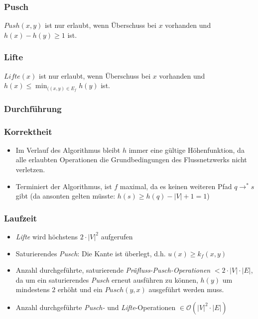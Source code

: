 \subsubsection{Pusch}
\(Push(x,y)\) ist nur erlaubt, wenn Überschuss bei \(x\) vorhanden und \(h(x)-h(y) \geq 1\) ist.


\subsubsection{Lifte}
\(Lifte(x)\) ist nur erlaubt, wenn Überschuss bei \(x\) vorhanden und \(h(x) \leq \min_{((x,y) \in E_f}{h(y)}\) ist.
\text{}\\


\subsubsection{Durchführung}


\subsubsection{Korrektheit}
\begin{itemize}
	\item Im Verlauf des Algorithmus bleibt \(h\) immer eine gültige Höhenfunktion, da alle erlaubten Operationen die Grundbedingungen des Flussnetzwerks nicht verletzen.
	\item Terminiert der Algorithmus, ist \(f\) maximal, da es keinen weiteren Pfad \(q \rightarrow^* s\) gibt (da ansonten gelten müsste: \(h(s) \geq h(q)-|V|+1=1\))
\end{itemize}

\subsubsection{Laufzeit}
\begin{itemize}
	\item \textit{Lifte} wird höchstens \(2 \cdot |V|^2\) aufgerufen
	\item Saturierendes \textit{Pusch}: Die Kante ist überlegt, d.h. \(u(x) \geq k_f(x,y)\)
	\item Anzahl durchgeführte, saturierende \textit{Präfluss-Pusch-Operationen} \(< 2 \cdot |V| \cdot |E|\), da um ein saturierendes \textit{Pusch} erneut ausführen zu können, \(h(y)\) um mindestens \(2\) erhöht und ein \(Pusch(y,x)\) ausgeführt werden muss.
	\item Anzahl durchgeführte \textit{Pusch-} und \textit{Lifte}-Operationen \(\in \mathcal{O}(|V|^2\cdot |E|)\)
\end{itemize}


